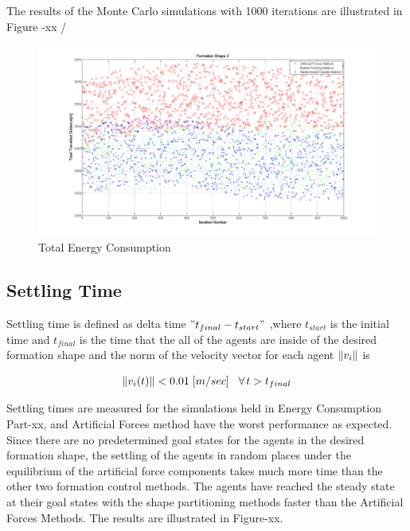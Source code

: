 The results of the Monte Carlo simulations with 1000 iterations are illustrated in Figure -xx /

\begin{figure}[H]
\caption{Total Energy Consumption}
\centerline{\includegraphics[scale = 0.35]{Total_Energy_Shape_2}}
\end{figure} 	
		   
\subsection{Settling Time} 
Settling time is defined as delta time $"t_{final} - t_{start}"$ ,where $t_{start}$ is the initial time and $t_{final}$ is the time that the all of the agents are inside of the desired formation shape and the norm of the velocity vector for each agent $\left\lVert v_i\right\rVert$ is
		
\begin{equation}
\left\lVert v_i(t)\right\rVert < 0.01 \hspace{0.1cm} [m/sec] \hspace{0.3cm}\forall\hspace{0.05cm} t>t_{final}
\end{equation}
		
Settling times are measured for the simulations held in Energy Consumption Part-xx, and Artificial Forces method have the worst performance as expected. Since there are no predetermined goal states for the agents in the desired formation shape, the settling of the agents in random places under the equilibrium of the artificial force components takes much more time than the other two formation control methods. The agents have reached the steady state at their goal states with the shape partitioning methods faster than the Artificial Forces Methods. The results are illustrated in Figure-xx.
		
